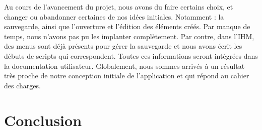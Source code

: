 \documentclass[a4paper,11pt]{article}
\begin{document}
		Au cours de l'avancement du projet, nous avons du faire certains choix, et changer ou abandonner certaines de nos idées initiales. Notamment : la sauvegarde, ainsi que l'ouverture et l'édition des éléments créés.
		Par manque de temps, nous n'avons pas pu les implanter complètement. Par contre, dans l'IHM, des menus sont déjà présents pour gérer la sauvegarde et nous avons écrit les débuts de scripts qui correspondent. Toutes ces informations seront intégrées dans la documentation utilisateur.
		Globalement, nous sommes arrivés à un résultat très proche de notre conception initiale de l'application et qui répond au cahier des charges.
	
	\section{Conclusion} %
			
\end{document}
